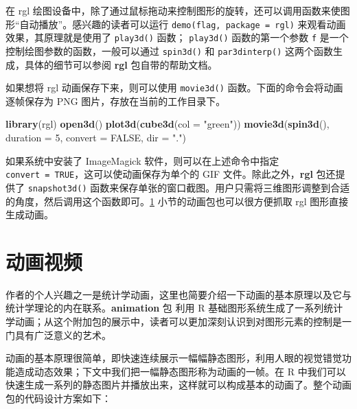 \documentclass[
  b5paper,
  UTF8,twoside]{book}
\newenvironment{Shaded}{\begin{snugshade}}{\end{snugshade}}
\newcommand{\AttributeTok}[1]{\textcolor[rgb]{0.13,0.29,0.53}{#1}}
\newcommand{\ConstantTok}[1]{\textcolor[rgb]{0.56,0.35,0.01}{#1}}
\newcommand{\DecValTok}[1]{\textcolor[rgb]{0.00,0.00,0.81}{#1}}
\newcommand{\FunctionTok}[1]{\textcolor[rgb]{0.13,0.29,0.53}{\textbf{#1}}}
\newcommand{\NormalTok}[1]{#1}
\newcommand{\StringTok}[1]{\textcolor[rgb]{0.31,0.60,0.02}{#1}}
\begin{document}
在 rgl 绘图设备中，除了通过鼠标拖动来控制图形的旋转，还可以调用函数来使图形``自动播放''。感兴趣的读者可以运行 \texttt{demo(\textquotesingle{}flag\textquotesingle{},\ package\ =\ \textquotesingle{}rgl\textquotesingle{})} 来观看动画效果，其原理就是使用了 \texttt{play3d()} 函数； \texttt{play3d()} 函数的第一个参数 \texttt{f} 是一个控制绘图参数的函数，一般可以通过 \texttt{spin3d()} 和 \texttt{par3dinterp()} 这两个函数生成，具体的细节可以参阅 \textbf{rgl} 包自带的帮助文档。

如果想将 rgl 动画保存下来，则可以使用 \texttt{movie3d()} 函数。下面的命令会将动画逐帧保存为 PNG 图片，存放在当前的工作目录下。

\begin{Shaded}
\begin{Highlighting}[]
\FunctionTok{library}\NormalTok{(rgl)}
\FunctionTok{open3d}\NormalTok{()}
\FunctionTok{plot3d}\NormalTok{(}\FunctionTok{cube3d}\NormalTok{(}\AttributeTok{col =} \StringTok{"green"}\NormalTok{))}
\FunctionTok{movie3d}\NormalTok{(}\FunctionTok{spin3d}\NormalTok{(), }\AttributeTok{duration =} \DecValTok{5}\NormalTok{, }\AttributeTok{convert =} \ConstantTok{FALSE}\NormalTok{, }\AttributeTok{dir =} \StringTok{"."}\NormalTok{)}
\end{Highlighting}
\end{Shaded}

如果系统中安装了 ImageMagick 软件，则可以在上述命令中指定 \texttt{convert\ =\ TRUE}，这可以使动画保存为单个的 GIF 文件。除此之外，\textbf{rgl} 包还提供了 \texttt{snapshot3d()} 函数来保存单张的窗口截图。用户只需将三维图形调整到合适的角度，然后调用这个函数即可。\ref{sec:animation} 小节的动画包也可以很方便抓取 rgl 图形直接生成动画。

\section{动画视频}\label{sec:animation}

作者的个人兴趣之一是统计学动画，这里也简要介绍一下动画的基本原理以及它与统计学理论的内在联系。\textbf{animation} 包 \citep{animation} 利用 R 基础图形系统生成了一系列统计学动画；从这个附加包的展示中，读者可以更加深刻认识到对图形元素的控制是一门具有广泛意义的艺术。

动画的基本原理很简单，即快速连续展示一幅幅静态图形，利用人眼的视觉错觉功能造成动态效果；下文中我们把一幅静态图形称为动画的一帧。在 R 中我们可以快速生成一系列的静态图片并播放出来，这样就可以构成基本的动画了。整个动画包的代码设计方案如下：
\end{document}
